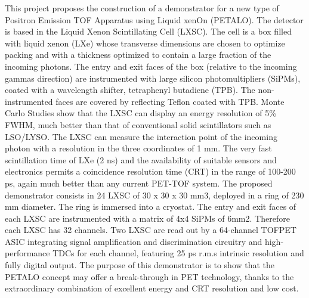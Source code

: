 This project proposes the construction of a demonstrator for a new type of Positron Emission TOF Apparatus using Liquid xenOn (PETALO). The detector is based in the  Liquid Xenon Scintillating Cell (LXSC). The cell is a box filled with liquid xenon (LXe) whose transverse dimensions are chosen to optimize packing and with a thickness optimized to contain a large fraction of the incoming photons. The entry and exit faces of the box (relative to the incoming gammas direction) are instrumented with large silicon photomultipliers (SiPMs), coated with a wavelength shifter, tetraphenyl butadiene (TPB). The non-instrumented faces are covered by reflecting Teflon coated with TPB. Monte Carlo Studies show that the LXSC can display an energy resolution of 5\% FWHM, much better than that of conventional solid scintillators such as LSO/LYSO. The LXSC can measure the interaction point of the incoming photon with a resolution in the three coordinates of 1 mm. The very fast scintillation time of LXe (2 ns) and the availability of suitable sensors and electronics permits a coincidence resolution time (CRT) in the range of 100-200 ps, again much better than any current PET-TOF system. The proposed demonstrator consists in 24 LXSC of 30 x 30 x 30 mm3, deployed in a ring of  230 mm diameter. The ring is immersed into a cryostat. The entry and exit faces of each LXSC are instrumented with a matrix of 4x4 SiPMs of 6mm2. Therefore each LXSC has 32 channels. Two LXSC are read out by a 64-channel TOFPET ASIC integrating signal amplification and discrimination circuitry and high-performance TDCs for each channel, featuring 25 ps r.m.s intrinsic resolution and fully digital output. The purpose of this demonstrator is to show that the PETALO concept may offer a break-through in PET technology, thanks to the extraordinary combination of excellent energy and CRT resolution and low cost. 